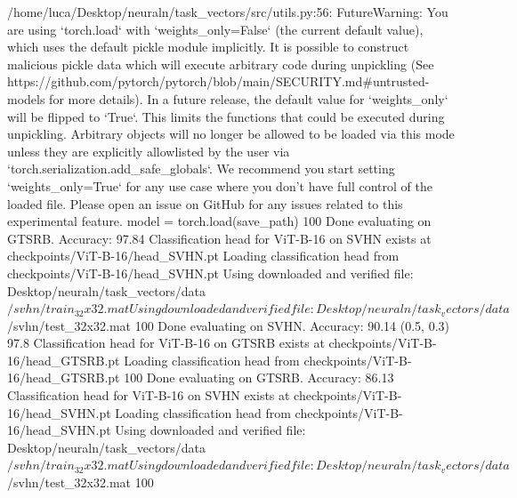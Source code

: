 /home/luca/Desktop/neuraln/task_vectors/src/utils.py:56: FutureWarning: You are using `torch.load` with `weights_only=False` (the current default value), which uses the default pickle module implicitly. It is possible to construct malicious pickle data which will execute arbitrary code during unpickling (See https://github.com/pytorch/pytorch/blob/main/SECURITY.md#untrusted-models for more details). In a future release, the default value for `weights_only` will be flipped to `True`. This limits the functions that could be executed during unpickling. Arbitrary objects will no longer be allowed to be loaded via this mode unless they are explicitly allowlisted by the user via `torch.serialization.add_safe_globals`. We recommend you start setting `weights_only=True` for any use case where you don't have full control of the loaded file. Please open an issue on GitHub for any issues related to this experimental feature.
  model = torch.load(save_path)
100%
Done evaluating on GTSRB. Accuracy: 97.84%
Classification head for ViT-B-16 on SVHN exists at checkpoints/ViT-B-16/head_SVHN.pt
Loading classification head from checkpoints/ViT-B-16/head_SVHN.pt
Using downloaded and verified file: Desktop/neuraln/task_vectors/data$/svhn/train_32x32.mat
Using downloaded and verified file: Desktop/neuraln/task_vectors/data$/svhn/test_32x32.mat
100%
Done evaluating on SVHN. Accuracy: 90.14%
  (0.5, 0.3)        97.8%
Classification head for ViT-B-16 on GTSRB exists at checkpoints/ViT-B-16/head_GTSRB.pt
Loading classification head from checkpoints/ViT-B-16/head_GTSRB.pt
100%
Done evaluating on GTSRB. Accuracy: 86.13%
Classification head for ViT-B-16 on SVHN exists at checkpoints/ViT-B-16/head_SVHN.pt
Loading classification head from checkpoints/ViT-B-16/head_SVHN.pt
Using downloaded and verified file: Desktop/neuraln/task_vectors/data$/svhn/train_32x32.mat
Using downloaded and verified file: Desktop/neuraln/task_vectors/data$/svhn/test_32x32.mat
100%
